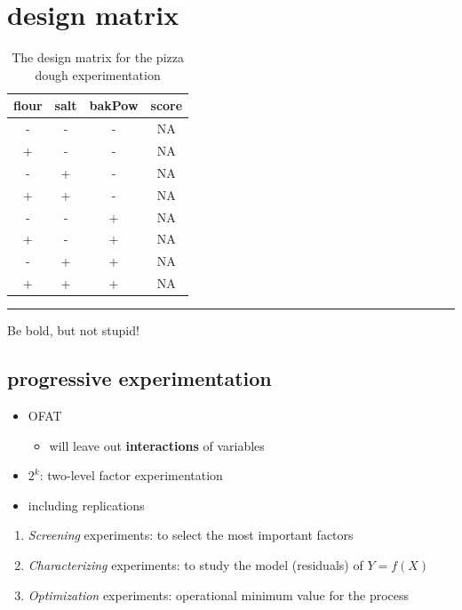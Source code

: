 \documentclass[
  a4paper,
]{scrbook}
\providecommand{\tightlist}{%
  \setlength{\itemsep}{0pt}\setlength{\parskip}{0pt}}\usepackage{longtable,booktabs,array}
\begin{document}
\section{design matrix}\label{design-matrix}

\begingroup
\fontsize{12.0pt}{14.4pt}\selectfont

\begin{longtable}{cccc}

\caption{\label{tbl-dm}The design matrix for the pizza dough
experimentation}

\tabularnewline

\toprule
flour & salt & bakPow & score \\ 
\midrule\addlinespace[2.5pt]
- & - & - & NA \\ 
+ & - & - & NA \\ 
- & + & - & NA \\ 
+ & + & - & NA \\ 
- & - & + & NA \\ 
+ & - & + & NA \\ 
- & + & + & NA \\ 
+ & + & + & NA \\ 
\bottomrule

\end{longtable}

\endgroup

\begin{center}\rule{0.5\linewidth}{0.5pt}\end{center}

Be bold, but not stupid!

\subsection{progressive
experimentation}\label{progressive-experimentation}

\begin{itemize}
\tightlist
\item
  OFAT

  \begin{itemize}
  \tightlist
  \item
    will leave out \textbf{interactions} of variables
  \end{itemize}
\item
  \(2^k\): two-level factor experimentation
\item
  including replications
\end{itemize}

\begin{enumerate}
\def\labelenumi{\arabic{enumi}.}
\tightlist
\item
  \emph{Screening} experiments: to select the most important factors
\item
  \emph{Characterizing} experiments: to study the model (residuals) of
  \(Y = f(X)\)
\item
  \emph{Optimization} experiments: operational minimum value for the
  process
\end{enumerate}
\end{document}
